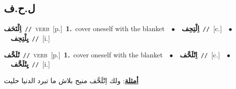 \documentclass[10pt,a4paper,twoside]{article} %
\begin{document}
\begin{multicols}{2}
\vspace{-3mm}
\subsection*{\color{blue}\foreignlanguage{arabic}{ل.ح.ف}\color{blue}{}} 

{\setlength\topsep{0pt}\textbf{\foreignlanguage{arabic}{اِلْتَحَف}}\ {\color{gray}\texttt{//}\color{black}}\ \textsc{verb}\ [p.]\ \textbf{1.}~cover oneself with the blanket\ \ $\bullet$\ \ \setlength\topsep{0pt}\textbf{\foreignlanguage{arabic}{اِلْتِحِف}}\ {\color{gray}\texttt{//}\color{black}}\ [c.]\ \ $\bullet$\ \ \setlength\topsep{0pt}\textbf{\foreignlanguage{arabic}{يِلْتِحِف}}\ {\color{gray}\texttt{//}\color{black}}\ [i.]\ } \vspace{2mm}

{\setlength\topsep{0pt}\textbf{\foreignlanguage{arabic}{تْلَحَّف}}\ {\color{gray}\texttt{//}\color{black}}\ \textsc{verb}\ [p.]\ \textbf{1.}~cover oneself with the blanket\ \ $\bullet$\ \ \setlength\topsep{0pt}\textbf{\foreignlanguage{arabic}{اِتْلَحَّف}}\ {\color{gray}\texttt{//}\color{black}}\ [c.]\ \ $\bullet$\ \ \setlength\topsep{0pt}\textbf{\foreignlanguage{arabic}{يِتْلَحَّف}}\ {\color{gray}\texttt{//}\color{black}}\ [i.]\  \begin{flushright}\color{gray}\foreignlanguage{arabic}{\textbf{\underline{\foreignlanguage{arabic}{أمثلة}}}: ولك اِتْلَحَّف منيح بلاش ما تبرد الدنيا حليت}\end{flushright}\color{black}} \vspace{2mm}


\end{multicols}
\end{document}
